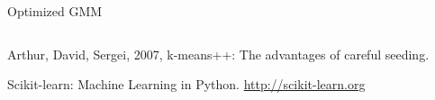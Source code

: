 \begin{frame}{Optimized GMM}
  \begin{columns}
    \begin{column}{0.5\textwidth}
      \begin{center}
      \end{center}
      \vspace{0.6em}
    \end{column}
    \begin{column}{0.6\textwidth}
    \end{column}
  \end{columns}
  \vspace{2em}

  \begin{reference}{4mm}{85mm}
    Arthur, David, Sergei, 2007,
    k-means++: The advantages of careful seeding.

    Scikit-learn: Machine Learning in {P}ython. \url{http://scikit-learn.org}
  \end{reference}
\end{frame}

